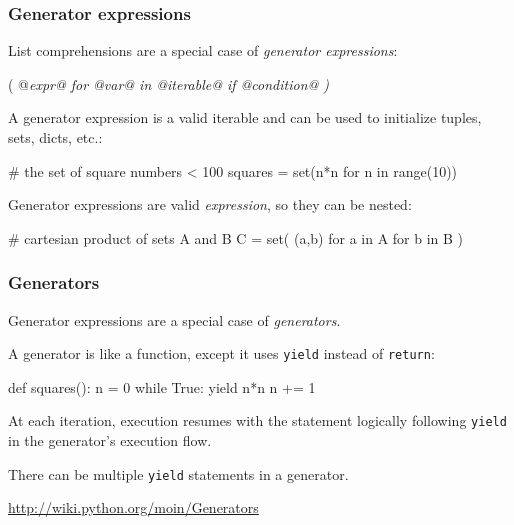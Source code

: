 \documentclass[english,serif,mathserif,xcolor=pdftex,dvipsnames,table]{beamer}
\begin{document}
\begin{frame}[fragile]
  \frametitle{Generator expressions}
  \def\e{\ttfamily\itshape}

  List comprehensions are a special case of \emph{generator expressions}:
  \begin{python}
    ( @\e expr@ for @\e var@ in @\e iterable@ if @\e condition@ )
  \end{python}

  \+
  A generator expression is a valid iterable and can be used to
  initialize tuples, sets, dicts, etc.:
  \begin{python}
    # the set of square numbers < 100
    squares = set(n*n for n in range(10))
  \end{python}

  \+
  Generator expressions are valid \emph{expression}, so they can be nested:
  \begin{python}
    # cartesian product of sets A and B
    C = set( (a,b) for a in A for b in B )
  \end{python}
\end{frame}


\begin{frame}[fragile]
  \frametitle{Generators}
  Generator expressions are a special case of \emph{generators}.

  \+ A generator is like a function, except it uses \lstinline|yield|
  instead of \lstinline|return|:
  \begin{python}
    def squares():
      n = 0
      while True:
        yield n*n
        n += 1
  \end{python}

  \+
  At each iteration, execution resumes with the statement logically
  following \lstinline|yield| in the generator's execution flow.

  \+
  There can be multiple \lstinline|yield| statements in a generator.

  \begin{references}
    \url{http://wiki.python.org/moin/Generators}
  \end{references}
\end{frame}
\end{document}
